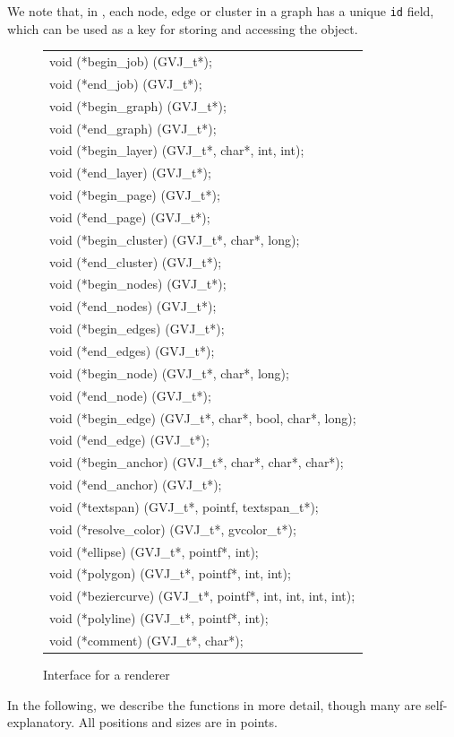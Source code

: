 We note that, in \gviz, each node, edge or cluster in a graph 
has a unique {\tt id}
field, which can be used as a key for storing and accessing the object.

\begin{figure}[htb]
\centering
\begin{tabular}{|l|} \hline
void (*begin\_job) (GVJ\_t*);  \\
void (*end\_job) (GVJ\_t*); \\
void (*begin\_graph) (GVJ\_t*); \\
void (*end\_graph) (GVJ\_t*); \\
void (*begin\_layer) (GVJ\_t*, char*, int, int); \\
void (*end\_layer) (GVJ\_t*); \\
void (*begin\_page) (GVJ\_t*); \\
void (*end\_page) (GVJ\_t*); \\
void (*begin\_cluster) (GVJ\_t*, char*, long); \\
void (*end\_cluster) (GVJ\_t*); \\
void (*begin\_nodes) (GVJ\_t*); \\
void (*end\_nodes) (GVJ\_t*); \\
void (*begin\_edges) (GVJ\_t*); \\
void (*end\_edges) (GVJ\_t*); \\
void (*begin\_node) (GVJ\_t*, char*, long); \\
void (*end\_node) (GVJ\_t*); \\
void (*begin\_edge) (GVJ\_t*, char*, bool, char*, long); \\
void (*end\_edge) (GVJ\_t*); \\
void (*begin\_anchor) (GVJ\_t*, char*, char*, char*); \\
void (*end\_anchor) (GVJ\_t*); \\
void (*textspan) (GVJ\_t*, pointf, textspan\_t*); \\
void (*resolve\_color) (GVJ\_t*, gvcolor\_t*); \\
void (*ellipse) (GVJ\_t*, pointf*, int); \\
void (*polygon) (GVJ\_t*, pointf*, int, int); \\
void (*beziercurve) (GVJ\_t*, pointf*, int, int, int, int); \\
void (*polyline) (GVJ\_t*, pointf*, int); \\
void (*comment) (GVJ\_t*, char*); \\ \hline
\end{tabular}
\caption{Interface for a renderer}
\label{fig:codegen}
\end{figure}
In the following, we describe the functions in more detail, though
many are self-explanatory. 
All positions and sizes are in points.

